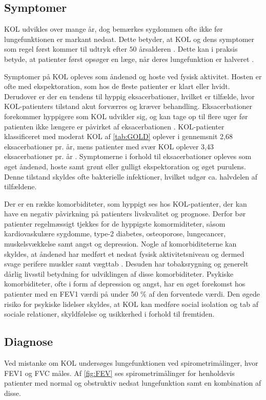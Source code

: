 \subsection{Symptomer}
KOL udvikles over mange år, dog bemærkes sygdommen ofte ikke før lungefunktionen er markant nedsat. Dette betyder, at KOL og dens symptomer som regel først kommer til udtryk efter $50$ årsalderen \cite{Lange2015}. Dette kan i praksis betyde, at patienter først opsøger en læge, når deres lungefunktion er halveret \cite{dsam2016}.

Symptomer på KOL opleves som åndenød og hoste ved fysisk aktivitet. Hosten er ofte med ekspektoration, som hos de fleste patienter er klart eller hvidt.\cite{Basisbogen2016} Derudover er der en tendens til hyppig eksacerbationer, hvilket er tilfælde, hvor KOL-patienters tilstand akut forværres og kræver behandling. Eksacerbationer forekommer hyppigere som KOL udvikler sig, og kan tage op til flere uger før patienten ikke længere er påvirket af eksacerbationen \cite{Anzueto2010}. KOL-patienter klassificeret med moderat KOL af \autoref{tab:GOLD} oplever i gennemsnit 2,68 eksacerbationer pr. år, mens patienter med svær KOL oplever 3,43 eksacerbationer pr. år \cite{Anzueto2010}.
Symptomerne i forhold til eksacerbationer opleves som øget åndenød, hoste samt grønt eller gulligt ekspektoration og øget purulens. Denne tilstand skyldes ofte bakterielle infektioner, hvilket udgør ca. halvdelen af tilfældene.\cite{dsam2016,Basisbogen2016} 

Der er en række komorbiditeter, som hyppigt ses hos KOL-patienter, der kan have en negativ påvirkning på patienters livskvalitet og prognose. Derfor bør patienter regelmæssigt tjekkes for de hyppigste komormiditeter, såsom kardiovaskulære sygdomme, type-2 diabetes, osteoporose, lungecancer, muskelsvækkelse samt angst og depression.
Nogle af komorbiditeterne kan skyldes, at åndenød har medført et nedsat fysisk aktivitetsniveau og dermed svage perifere muskler samt vægttab \cite{dsam2016}. Desuden har tobaksrygning og generelt dårlig livsstil betydning for udviklingen af disse komorbiditeter.\cite{dsam2016, McCarthy2015}
Psykiske komorbiditeter, ofte i form af depression og angst, har en øget forekomst hos patienter med en FEV1 værdi på under 50 \% af den forventede værdi. Den øgede risiko for psykiske lidelser skyldes, at KOL kan medføre social isolation og tab af sociale relationer, skyldfølelse og usikkerhed i forhold til fremtiden.\cite{dsam2016}


\subsection{Diagnose}
Ved mistanke om KOL undersøges lungefunktionen ved spirometrimålinger, hvor FEV1 og FVC måles. Af \autoref{fig:FEV} ses spirometrimålinger for henholdsvis patienter med normal og obstruktiv nedsat lungefunktion samt en kombination af disse.\cite{Basisbogen2016, Sundhed2013}

